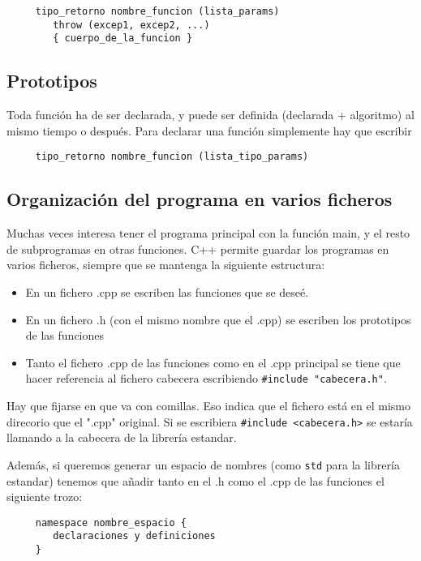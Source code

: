 \documentclass[a4paper]{article}
\begin{document}
	 \begin{verbatim}
	 tipo_retorno nombre_funcion (lista_params)
	 	throw (excep1, excep2, ...)
	 	{ cuerpo_de_la_funcion }
	 \end{verbatim}  
	 
	 \subsection{Prototipos}
	 Toda función ha de ser declarada, y puede ser definida (declarada + algoritmo) al mismo tiempo o después. Para declarar una función simplemente hay que escribir
	 
	 \begin{verbatim}
	 tipo_retorno nombre_funcion (lista_tipo_params)
	 \end{verbatim}
	 
	 \subsection{Organización del programa en varios ficheros}
	 Muchas veces interesa tener el programa principal con la función main, y el resto de subprogramas en 
	 otras funciones. C++ permite guardar los programas en varios ficheros, siempre que se mantenga la siguiente estructura:
	 \begin{itemize}
	 	\item En un fichero .cpp se escriben las funciones que se deseé.
	 	\item En un fichero .h (con el mismo nombre que el .cpp) se escriben los prototipos de las funciones
	 	\item Tanto el fichero .cpp de las funciones como en el .cpp principal se tiene que hacer referencia al fichero cabecera escribiendo \verb|#include "cabecera.h"|.
	 \end{itemize}
	 
	 Hay que fijarse en que va con comillas. Eso indica que el fichero está en el mismo direcorio que el ".cpp" original. Si se escribiera \verb|#include <cabecera.h>| se estaría llamando a la cabecera de la librería estandar.
	 
	 Además, si queremos generar un espacio de nombres (como \verb|std| para la librería estandar) tenemos que añadir tanto en el .h como el .cpp de las funciones el siguiente trozo:
	 
	 \begin{verbatim}
	 namespace nombre_espacio {
	 	declaraciones y definiciones
	 }
	 \end{verbatim}
	 
\end{document}
